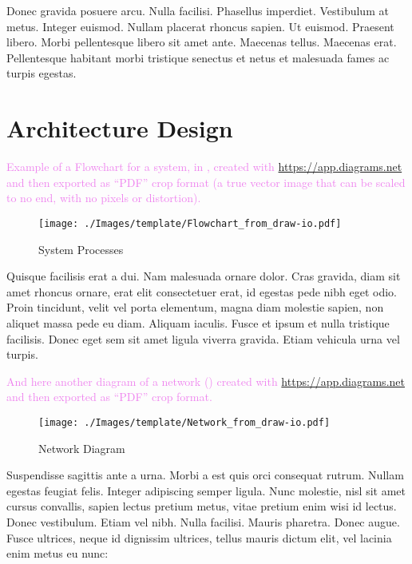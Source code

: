 \label{chap:architecture}

Donec gravida posuere arcu. Nulla facilisi. Phasellus imperdiet. Vestibulum at metus. Integer euismod. Nullam placerat rhoncus sapien. Ut euismod. Praesent libero. Morbi pellentesque libero sit amet ante. Maecenas tellus. Maecenas erat. Pellentesque habitant morbi tristique senectus et netus et malesuada fames ac turpis egestas.
\section{Architecture Design} 
\textcolor{violet}{Example of a Flowchart for a system, in , created with \url{https://app.diagrams.net} and then exported as ``PDF'' crop format (a true vector image that can be scaled to no end, with no pixels or distortion).}

\begin{figure}[h]
\centering
\texttt{[image: ./Images/template/Flowchart\_from\_draw-io.pdf]}
\caption{System Processes}
\label{fig:flowchart}
\end{figure}

Quisque facilisis erat a dui. Nam malesuada ornare dolor. Cras gravida, diam sit amet rhoncus ornare, erat elit consectetuer erat, id egestas pede nibh eget odio. Proin tincidunt, velit vel porta elementum, magna diam molestie sapien, non aliquet massa pede eu diam. Aliquam iaculis. Fusce et ipsum et nulla tristique facilisis. Donec eget sem sit amet ligula viverra gravida. Etiam vehicula urna vel turpis. 

\textcolor{violet}{And here another diagram of a network () created with \url{https://app.diagrams.net} and then exported as ``PDF'' crop format.}

\begin{figure}[h]
\centering
\texttt{[image: ./Images/template/Network\_from\_draw-io.pdf]}
\caption{Network Diagram}
\label{fig:network}
\end{figure}

Suspendisse sagittis ante a urna. Morbi a est quis orci consequat rutrum. Nullam egestas feugiat felis. Integer adipiscing semper ligula. Nunc molestie, nisl sit amet cursus convallis, sapien lectus pretium metus, vitae pretium enim wisi id lectus. Donec vestibulum. Etiam vel nibh. Nulla facilisi. Mauris pharetra. Donec augue. Fusce ultrices, neque id dignissim ultrices, tellus mauris dictum elit, vel lacinia enim metus eu nunc:

